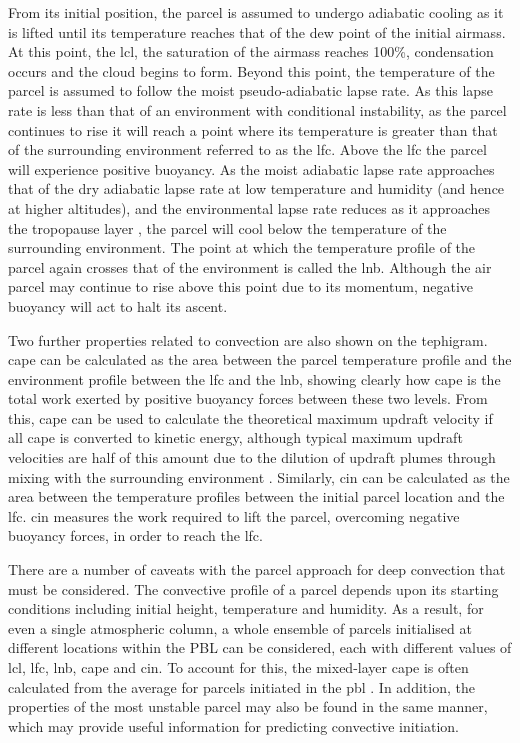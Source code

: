 From its initial position, the parcel is assumed to undergo adiabatic cooling as it is lifted until its temperature reaches that of the dew point of the initial airmass. 
At this point, the \acrshort{lcl}, the saturation of the airmass reaches 100\%, condensation occurs and the cloud begins to form. 
Beyond this point, the temperature of the parcel is assumed to follow the moist pseudo-adiabatic lapse rate. 
As this lapse rate is less than that of an environment with conditional instability, as the parcel continues to rise it will reach a point where its temperature is greater than that of the surrounding environment referred to as the \acrshort{lfc}. 
Above the \acrshort{lfc} the parcel will experience positive buoyancy. 
As the moist adiabatic lapse rate approaches that of the dry adiabatic lapse rate at low temperature and humidity (and hence at higher altitudes), and the environmental lapse rate reduces as it approaches the tropopause layer \citep{fueglistaler_tropical_2009}, the parcel will cool below the temperature of the surrounding environment. 
The point at which the temperature profile of the parcel again crosses that of the environment is called the \acrfull{lnb}. 
Although the air parcel may continue to rise above this point due to its momentum, negative buoyancy will act to halt its ascent.

Two further properties related to convection are also shown on the tephigram. 
\acrshort{cape} can be calculated as the area between the parcel temperature profile and the environment profile between the \acrshort{lfc} and the \acrshort{lnb}, showing clearly how \acrshort{cape} is the total work exerted by positive buoyancy forces between these two levels. 
From this, \acrshort{cape} can be used to calculate the theoretical maximum updraft velocity if all \acrshort{cape} is converted to kinetic energy, although typical maximum updraft velocities are half of this amount due to the dilution of updraft plumes through mixing with the surrounding environment \citep{romps_undiluted_2010}. 
Similarly, \acrfull{cin} can be calculated as the area between the temperature profiles between the initial parcel location and the \acrshort{lfc}. 
\acrshort{cin} measures the work required to lift the parcel, overcoming negative buoyancy forces, in order to reach the \acrshort{lfc}.

There are a number of caveats with the parcel approach for deep convection that must be considered. 
The convective profile of a parcel depends upon its starting conditions including initial height, temperature and humidity. 
As a result, for even a single atmospheric column, a whole ensemble of parcels initialised at different locations within the PBL can be considered, each with different values of \acrshort{lcl}, \acrshort{lfc}, \acrshort{lnb}, \acrshort{cape} and \acrshort{cin}. 
To account for this, the mixed-layer \acrshort{cape} is often calculated from the average for parcels initiated in the \acrshort{pbl} \citep{stull_practical_2016}. 
In addition, the properties of the most unstable parcel may also be found in the same manner, which may provide useful information for predicting convective initiation.

